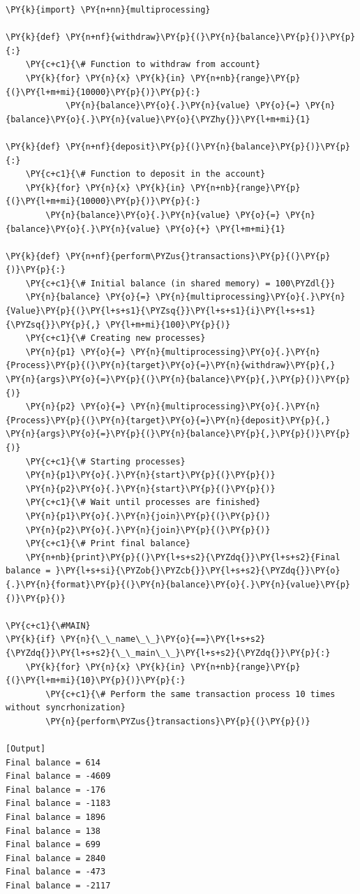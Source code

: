 \begin{Verbatim}[label=\makebox{\url{https://github.com/lucabaldini/cmepda/tree/master/slides/latex/snippets/synchro1.py}},commandchars=\\\{\}]
\PY{k}{import} \PY{n+nn}{multiprocessing}

\PY{k}{def} \PY{n+nf}{withdraw}\PY{p}{(}\PY{n}{balance}\PY{p}{)}\PY{p}{:}
    \PY{c+c1}{\# Function to withdraw from account}
    \PY{k}{for} \PY{n}{x} \PY{k}{in} \PY{n+nb}{range}\PY{p}{(}\PY{l+m+mi}{10000}\PY{p}{)}\PY{p}{:}
            \PY{n}{balance}\PY{o}{.}\PY{n}{value} \PY{o}{=} \PY{n}{balance}\PY{o}{.}\PY{n}{value}\PY{o}{\PYZhy{}}\PY{l+m+mi}{1}

\PY{k}{def} \PY{n+nf}{deposit}\PY{p}{(}\PY{n}{balance}\PY{p}{)}\PY{p}{:}
    \PY{c+c1}{\# Function to deposit in the account}
    \PY{k}{for} \PY{n}{x} \PY{k}{in} \PY{n+nb}{range}\PY{p}{(}\PY{l+m+mi}{10000}\PY{p}{)}\PY{p}{:}
        \PY{n}{balance}\PY{o}{.}\PY{n}{value} \PY{o}{=} \PY{n}{balance}\PY{o}{.}\PY{n}{value} \PY{o}{+} \PY{l+m+mi}{1}

\PY{k}{def} \PY{n+nf}{perform\PYZus{}transactions}\PY{p}{(}\PY{p}{)}\PY{p}{:}
    \PY{c+c1}{\# Initial balance (in shared memory) = 100\PYZdl{}}
    \PY{n}{balance} \PY{o}{=} \PY{n}{multiprocessing}\PY{o}{.}\PY{n}{Value}\PY{p}{(}\PY{l+s+s1}{\PYZsq{}}\PY{l+s+s1}{i}\PY{l+s+s1}{\PYZsq{}}\PY{p}{,} \PY{l+m+mi}{100}\PY{p}{)}
    \PY{c+c1}{\# Creating new processes}
    \PY{n}{p1} \PY{o}{=} \PY{n}{multiprocessing}\PY{o}{.}\PY{n}{Process}\PY{p}{(}\PY{n}{target}\PY{o}{=}\PY{n}{withdraw}\PY{p}{,} \PY{n}{args}\PY{o}{=}\PY{p}{(}\PY{n}{balance}\PY{p}{,}\PY{p}{)}\PY{p}{)}
    \PY{n}{p2} \PY{o}{=} \PY{n}{multiprocessing}\PY{o}{.}\PY{n}{Process}\PY{p}{(}\PY{n}{target}\PY{o}{=}\PY{n}{deposit}\PY{p}{,} \PY{n}{args}\PY{o}{=}\PY{p}{(}\PY{n}{balance}\PY{p}{,}\PY{p}{)}\PY{p}{)}
    \PY{c+c1}{\# Starting processes}
    \PY{n}{p1}\PY{o}{.}\PY{n}{start}\PY{p}{(}\PY{p}{)}
    \PY{n}{p2}\PY{o}{.}\PY{n}{start}\PY{p}{(}\PY{p}{)}
    \PY{c+c1}{\# Wait until processes are finished}
    \PY{n}{p1}\PY{o}{.}\PY{n}{join}\PY{p}{(}\PY{p}{)}
    \PY{n}{p2}\PY{o}{.}\PY{n}{join}\PY{p}{(}\PY{p}{)}
    \PY{c+c1}{\# Print final balance}
    \PY{n+nb}{print}\PY{p}{(}\PY{l+s+s2}{\PYZdq{}}\PY{l+s+s2}{Final balance = }\PY{l+s+si}{\PYZob{}\PYZcb{}}\PY{l+s+s2}{\PYZdq{}}\PY{o}{.}\PY{n}{format}\PY{p}{(}\PY{n}{balance}\PY{o}{.}\PY{n}{value}\PY{p}{)}\PY{p}{)}

\PY{c+c1}{\#MAIN}
\PY{k}{if} \PY{n}{\_\_name\_\_}\PY{o}{==}\PY{l+s+s2}{\PYZdq{}}\PY{l+s+s2}{\_\_main\_\_}\PY{l+s+s2}{\PYZdq{}}\PY{p}{:}
    \PY{k}{for} \PY{n}{x} \PY{k}{in} \PY{n+nb}{range}\PY{p}{(}\PY{l+m+mi}{10}\PY{p}{)}\PY{p}{:}
        \PY{c+c1}{\# Perform the same transaction process 10 times without syncrhonization}
        \PY{n}{perform\PYZus{}transactions}\PY{p}{(}\PY{p}{)}

[Output]
Final balance = 614
Final balance = -4609
Final balance = -176
Final balance = -1183
Final balance = 1896
Final balance = 138
Final balance = 699
Final balance = 2840
Final balance = -473
Final balance = -2117
\end{Verbatim}